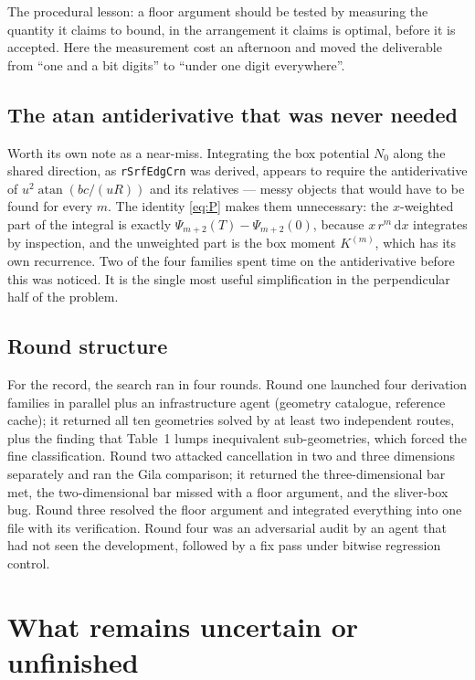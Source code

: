 \documentclass[11pt]{article}
\theoremstyle{remark}
\newcommand{\dd}{\mathrm{d}}
\newcommand{\atan}{\operatorname{atan}}
\newcommand{\code}[1]{\texttt{#1}}
\begin{document}
The procedural lesson: a floor argument should be tested by measuring the quantity it
claims to bound, in the arrangement it claims is optimal, before it is accepted. Here the
measurement cost an afternoon and moved the deliverable from ``one and a bit digits'' to
``under one digit everywhere''.

\subsection{The atan antiderivative that was never needed}

Worth its own note as a near-miss. Integrating the box potential $N_0$ along the shared
direction, as \code{rSrfEdgCrn} was derived, appears to require the antiderivative of
$u^2\atan(bc/(uR))$ and its relatives --- messy objects that would have to be found for
every $m$. The identity \eqref{eq:P} makes them unnecessary: the $x$-weighted part of the
integral is exactly $\Psi_{m+2}(T) - \Psi_{m+2}(0)$, because $x\,r^m\,\dd x$ integrates by
inspection, and the unweighted part is the box moment $K^{(m)}$, which has its own
recurrence. Two of the four families spent time on the antiderivative before this was
noticed. It is the single most useful simplification in the perpendicular half of the
problem.

\subsection{Round structure}

For the record, the search ran in four rounds. Round one launched four derivation families
in parallel plus an infrastructure agent (geometry catalogue, reference cache); it returned
all ten geometries solved by at least two independent routes, plus the finding that Table~1
lumps inequivalent sub-geometries, which forced the fine classification. Round two attacked
cancellation in two and three dimensions separately and ran the Gila comparison; it returned
the three-dimensional bar met, the two-dimensional bar missed with a floor argument, and
the sliver-box bug. Round three resolved the floor argument and integrated everything into
one file with its verification. Round four was an adversarial audit by an agent that had
not seen the development, followed by a fix pass under bitwise regression control.

\section{What remains uncertain or unfinished}
\label{sec:open}
\end{document}
